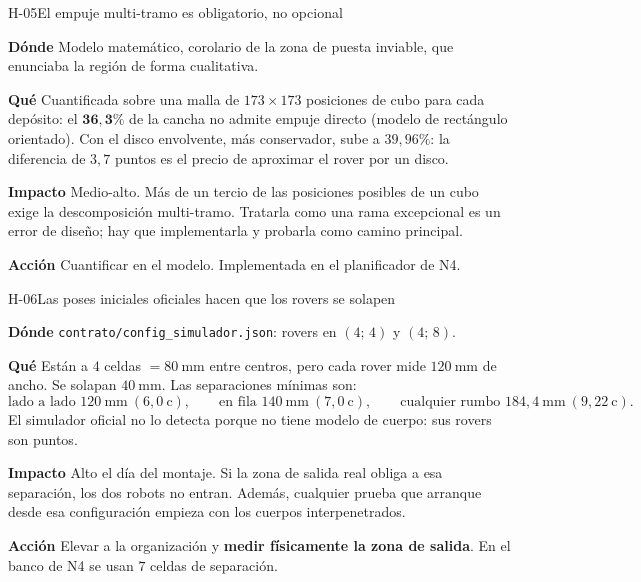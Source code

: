 \documentclass[11pt,a4paper]{article}
\newcommand{\campo}[1]{\par\smallskip\noindent\textbf{#1}\quad\ignorespaces}
\begin{document}
\begin{hallazgo}{H-05}{El empuje multi-tramo es obligatorio, no opcional}
\campo{Dónde} Modelo matemático, corolario de la zona de puesta inviable, que enunciaba
la región de forma cualitativa.
\campo{Qué} Cuantificada sobre una malla de $173\times173$ posiciones de cubo para cada
depósito: el $\mathbf{36{,}3\%}$ de la cancha no admite empuje directo (modelo de
rectángulo orientado). Con el disco envolvente, más conservador, sube a $39{,}96\%$: la
diferencia de $3{,}7$ puntos es el precio de aproximar el rover por un disco.
\campo{Impacto} Medio-alto. Más de un tercio de las posiciones posibles de un cubo exige
la descomposición multi-tramo. Tratarla como una rama excepcional es un error de diseño;
hay que implementarla y probarla como camino principal.
\campo{Acción} Cuantificar en el modelo. Implementada en el planificador de N4.
\end{hallazgo}

\begin{hallazgo}{H-06}{Las poses iniciales oficiales hacen que los rovers se solapen}
\campo{Dónde} \texttt{contrato/config\_simulador.json}: rovers en $(4;\,4)$ y $(4;\,8)$.
\campo{Qué} Están a $4$ celdas $=80\ \mathrm{mm}$ entre centros, pero cada rover mide
$120\ \mathrm{mm}$ de ancho. Se solapan $40\ \mathrm{mm}$. Las separaciones mínimas son:
\[
  \text{lado a lado } 120\ \mathrm{mm}\ (6{,}0\ \text{c}),\qquad
  \text{en fila } 140\ \mathrm{mm}\ (7{,}0\ \text{c}),\qquad
  \text{cualquier rumbo } 184{,}4\ \mathrm{mm}\ (9{,}22\ \text{c}).
\]
El simulador oficial no lo detecta porque no tiene modelo de cuerpo: sus rovers son
puntos.
\campo{Impacto} Alto el día del montaje. Si la zona de salida real obliga a esa
separación, los dos robots no entran. Además, cualquier prueba que arranque desde esa
configuración empieza con los cuerpos interpenetrados.
\campo{Acción} Elevar a la organización y \textbf{medir físicamente la zona de salida}.
En el banco de N4 se usan $7$ celdas de separación.
\end{hallazgo}
\end{document}
